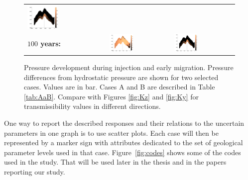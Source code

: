 \begin{figure}
\begin{tabular}{MMM}
\includegraphics[width=0.4\textwidth]{./figurer/C03211p50_slcy}\\
\textbf{$100$ years:}&
\includegraphics[width=0.4\textwidth]{./figurer/C02222p100_slcy}&
\includegraphics[width=0.4\textwidth]{./figurer/C03211p100_slcy}\\
\end{tabular}
\caption{Pressure development during injection and early migration. Pressure differences from hydrostatic pressure are shown for two selected cases. Values are in bar. Cases A and B are described in Table \ref{tab:AaB}. Compare with Figures \ref{fig:Kz} and \ref{fig:Ky} for transmissibility values in different directions.}
\label{fig:Pplume}
\end{figure}


One way to report the described responses and their relations to the uncertain
parameters in one graph is to use scatter plots. Each case will then be
represented by a marker sign with attributes dedicated to the set of geological
parameter levels used in that case. Figure~\ref{fig:codes} shows some of the codes used in the study. That will be used later in the thesis and in the papers reporting our study.


